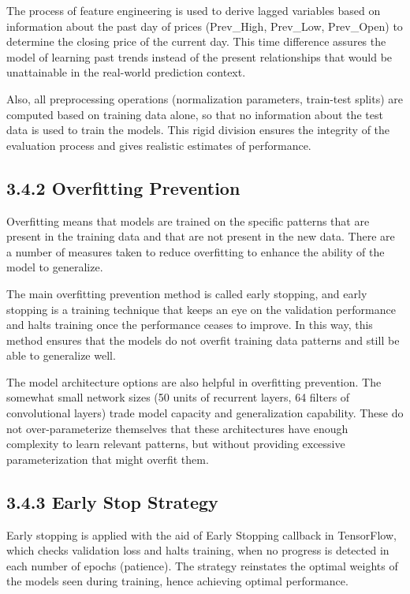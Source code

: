 \documentclass[12pt,a4paper]{report}
\begin{document}
The process of feature engineering is used to derive lagged variables based on information about the past day of prices (Prev\_High, Prev\_Low, Prev\_Open) to determine the closing price of the current day. This time difference assures the model of learning past trends instead of the present relationships that would be unattainable in the real-world prediction context.

Also, all preprocessing operations (normalization parameters, train-test splits) are computed based on training data alone, so that no information about the test data is used to train the models. This rigid division ensures the integrity of the evaluation process and gives realistic estimates of performance.

\subsection{3.4.2 Overfitting Prevention}
Overfitting means that models are trained on the specific patterns that are present in the training data and that are not present in the new data. There are a number of measures taken to reduce overfitting to enhance the ability of the model to generalize.

The main overfitting prevention method is called early stopping, and early stopping is a training technique that keeps an eye on the validation performance and halts training once the performance ceases to improve. In this way, this method ensures that the models do not overfit training data patterns and still be able to generalize well.

The model architecture options are also helpful in overfitting prevention. The somewhat small network sizes (50 units of recurrent layers, 64 filters of convolutional layers) trade model capacity and generalization capability. These do not over-parameterize themselves that these architectures have enough complexity to learn relevant patterns, but without providing excessive parameterization that might overfit them.

\subsection{3.4.3 Early Stop Strategy}
Early stopping is applied with the aid of Early Stopping callback in TensorFlow, which checks validation loss and halts training, when no progress is detected in each number of epochs (patience). The strategy reinstates the optimal weights of the models seen during training, hence achieving optimal performance.
\end{document}
